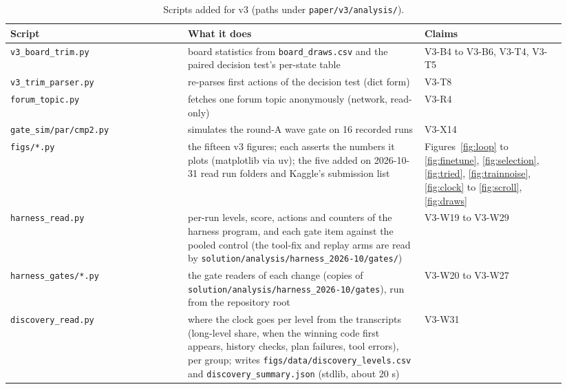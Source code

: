 \begin{table}[!htb]
\caption{Scripts added for v3 (paths under \texttt{paper/v3/analysis/}).}\label{tab:regen3}
\centering\footnotesize
\setlength{\tabcolsep}{3pt}
\begin{tabular}{@{}>{\raggedright\arraybackslash}p{0.30\linewidth}>{\raggedright\arraybackslash}p{0.40\linewidth}>{\raggedright\arraybackslash}p{0.24\linewidth}@{}}
\toprule
Script & What it does & Claims \\
\midrule
\texttt{v3\_\allowbreak{}board\_\allowbreak{}trim.py} & board statistics from \texttt{board\_draws.csv} and the paired decision test's per-state table & V3-B4 to V3-B6, V3-T4, V3-T5 \\
\texttt{v3\_\allowbreak{}trim\_\allowbreak{}parser.py} & re-parses first actions of the decision test (dict form) & V3-T8 \\
\texttt{forum\_\allowbreak{}topic.py} & fetches one forum topic anonymously (network, read-only) & V3-R4 \\
\texttt{gate\_\allowbreak{}sim/\allowbreak{}par/\allowbreak{}cmp2.py} & simulates the round-A wave gate on 16 recorded runs & V3-X14 \\
\texttt{figs/\allowbreak{}*.py} & the fifteen v3 figures; each asserts the numbers it plots (matplotlib via uv); the five added on 2026-10-31 read run folders and Kaggle's submission list & Figures~\ref{fig:loop} to \ref{fig:finetune}, \ref{fig:selection}, \ref{fig:tried}, \ref{fig:trainnoise}, \ref{fig:clock} to \ref{fig:scroll}, \ref{fig:draws} \\
\texttt{harness\_\allowbreak{}read.py} & per-run levels, score, actions and counters of the harness program, and each gate item against the pooled control (the tool-fix and replay arms are read by \texttt{solution/\allowbreak{}analysis/\allowbreak{}harness\_2026-10/\allowbreak{}gates/}) & V3-W19 to V3-W29 \\
\texttt{harness\_\allowbreak{}gates/\allowbreak{}*.py} & the gate readers of each change (copies of \texttt{solution/\allowbreak{}analysis/\allowbreak{}harness\_\allowbreak{}2026-10/\allowbreak{}gates}), run from the repository root & V3-W20 to V3-W27 \\
\texttt{discovery\_\allowbreak{}read.py} & where the clock goes per level from the transcripts (long-level share, when the winning code first appears, history checks, plan failures, tool errors), per group; writes \texttt{figs/\allowbreak{}data/\allowbreak{}discovery\_\allowbreak{}levels.csv} and \texttt{discovery\_\allowbreak{}summary.json} (stdlib, about 20 s) & V3-W31 \\

\end{tabular}
\end{table}
